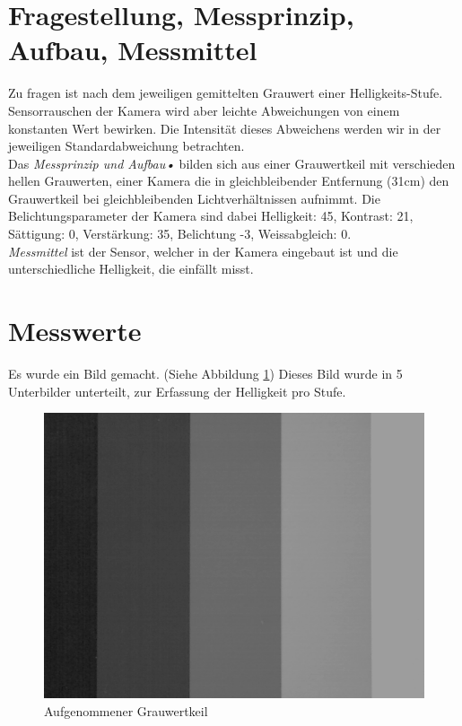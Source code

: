 \documentclass[12pt,oneside,a4paper]{report}
\begin{document}
\section{Fragestellung, Messprinzip, Aufbau, Messmittel}
\label{chap:VERSUCH_1_FRAGESTELLUNG}
Zu fragen ist nach dem jeweiligen gemittelten Grauwert einer Helligkeits-Stufe. Sensorrauschen der Kamera wird aber leichte Abweichungen von einem konstanten Wert bewirken.  Die Intensität dieses Abweichens werden wir in der jeweiligen Standardabweichung betrachten.\\
Das \textit{Messprinzip und Aufbau•} bilden sich aus einer Grauwertkeil mit verschieden hellen Grauwerten, einer Kamera die in gleichbleibender Entfernung (31cm) den Grauwertkeil bei gleichbleibenden Lichtverhältnissen aufnimmt. Die Belichtungsparameter der Kamera sind dabei Helligkeit: 45, Kontrast: 21, Sättigung: 0, Verstärkung: 35, Belichtung -3, Weissabgleich: 0.\\
\textit{Messmittel} ist der Sensor, welcher in der Kamera eingebaut ist und die unterschiedliche Helligkeit, die einfällt misst.

\section{Messwerte}
\label{chap:VERSUCH_1_MESSWERTE}
Es wurde ein Bild gemacht. (Siehe Abbildung \ref{fig:GRAUWERTKEIL})
Dieses Bild wurde in 5 Unterbilder unterteilt, zur Erfassung der Helligkeit pro Stufe. 

\begin{figure}[H]
	\centering\small
	\includegraphics[width=\textwidth]{src/Grauwertkeil.png}
	\caption{Aufgenommener Grauwertkeil}
	\label{fig:GRAUWERTKEIL}
\end{figure}
\end{document}
